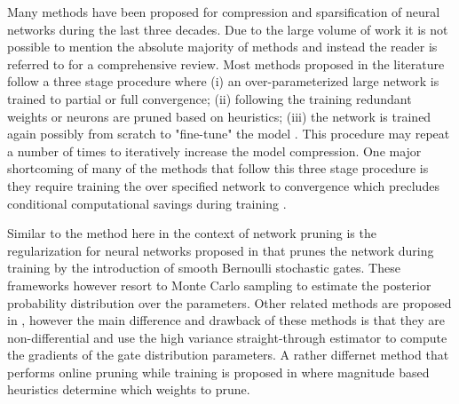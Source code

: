 \documentclass[final,1p,times]{elsarticle}
\begin{document}
Many methods have been proposed for compression and sparsification of neural networks during the last three decades. Due to the large volume of work it is not possible to mention the absolute majority of methods and instead the reader is referred to \cite{journals/corr/abs-1710-09282, DBLP:conf/mlsys/BlalockOFG20} for a comprehensive review. Most methods proposed in the literature follow a three stage procedure where (i) an over-parameterized large network is trained to partial or full convergence; (ii) following the training redundant weights or neurons are pruned based on heuristics; (iii) the network is trained again possibly from scratch to "fine-tune" the model \cite{liu2018rethinking,10.5555/2969239.2969366, DBLP:conf/iclr/MolchanovTKAK17, DBLP:conf/iccv/LuoWL17}. This procedure may repeat a number of times to iteratively increase the model compression. One major shortcoming of many of the methods that follow this three stage procedure is they require training the over specified network to convergence which precludes conditional computational savings during training \cite{liu2018rethinking, journals/corr/BengioLC13}.

Similar to the method here in the context of network pruning is the  regularization for neural networks proposed in \cite{louizos2018learning, Huang_2020_CVPR_Workshops} that prunes the network during training by the introduction of smooth Bernoulli stochastic gates. These frameworks however resort to Monte Carlo sampling to estimate the posterior probability distribution over the parameters. Other related methods are proposed in \cite{srinivas2016training, srinivas2016generalized}, however the main difference and drawback of these methods is that they are non-differential and use the high variance straight-through estimator \cite{journals/corr/BengioLC13} to compute the gradients of the gate distribution parameters. A rather differnet method that performs online pruning while training is proposed in \cite{journals/corr/abs-1710-01878} where magnitude based heuristics determine which weights to prune.
\end{document}
